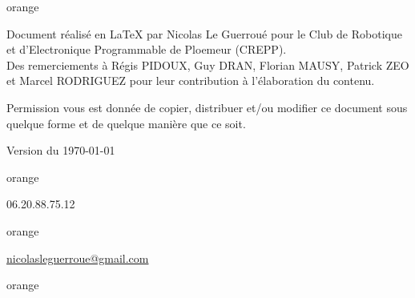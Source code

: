 
\begin{items}{orange}{\Triangle}
\item Document réalisé en \LaTeX{} par Nicolas Le Guerroué 
pour le Club de Robotique et d'Electronique Programmable de Ploemeur (CREPP).\\
Des remerciements à Régis PIDOUX, Guy DRAN, Florian MAUSY, Patrick ZEO et Marcel RODRIGUEZ pour leur contribution à l'élaboration du contenu. 
\item Permission vous est donnée de copier, distribuer et/ou modifier ce document sous quelque forme et de quelque manière que ce soit.
\item Version du \today
\end{items}


\begin{items}{orange}{\faPhone}
    \item 06.20.88.75.12
\end{items}

\begin{items}{orange}{\faEnvelope}
    \item \href{mailto:nicolasleguerroue@gmail.com}{nicolasleguerroue@gmail.com}
\end{items}

\begin{items}{orange}{\Triangle}
    \item {}
\end{items}

